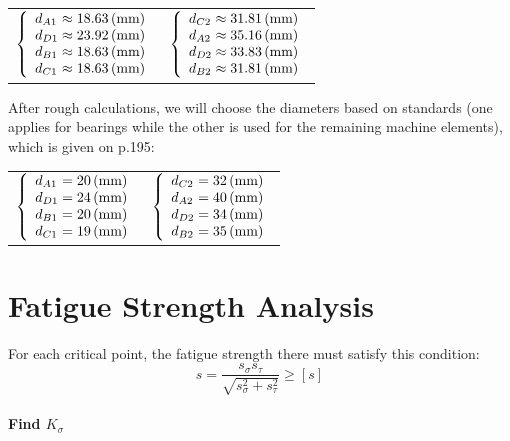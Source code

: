 \begin{tabular}{p{7cm}p{7cm}}
		$
		\left\{ 
		\begin{array}{l@{{} \approx {}}l}
		d_{A1} & 18.63 \unit{(mm)}\\
		d_{D1} & 23.92 \unit{(mm)}\\
		d_{B1} & 18.63 \unit{(mm)}\\
		d_{C1} & 18.63 \unit{(mm)}\\
		\end{array}
		\right.
		$ &
		$
		\left\{ 
		\begin{array}{l@{{} \approx {}}l}
		d_{C2} & 31.81 \unit{(mm)}\\
		d_{A2} & 35.16 \unit{(mm)}\\
		d_{D2} & 33.83 \unit{(mm)}\\
		d_{B2} & 31.81\unit{(mm)}\\
		\end{array}
		\right.
		$
	\end{tabular}

After rough calculations, we will choose the diameters based on standards (one applies for bearings while the other is used for the remaining machine elements), which is given on p.195:

	\begin{tabular}{p{7cm}p{7cm}}
		$
		\left\{ 
		\begin{array}{l@{{} = {}}l}
		d_{A1} & 20 \unit{(mm)}\\
		d_{D1} & 24 \unit{(mm)}\\
		d_{B1} & 20 \unit{(mm)}\\
		d_{C1} & 19 \unit{(mm)}\\
		\end{array}
		\right.
		$ &
		$
		\left\{ 
		\begin{array}{l@{{} = {}}l}
		d_{C2} & 32 \unit{(mm)}\\
		d_{A2} & 40 \unit{(mm)}\\
		d_{D2} & 34 \unit{(mm)}\\
		d_{B2} & 35 \unit{(mm)}\\
		\end{array}
		\right.
		$
	\end{tabular}

\section{Fatigue Strength Analysis}
For each critical point, the fatigue strength there must satisfy this condition:
\[s=\dfrac{s_\sigma s_\tau}{\sqrt{s_\sigma^2+s_\tau^2}}\geq[s]\]
\paragraph{Find $ K_{\sigma} $} 

